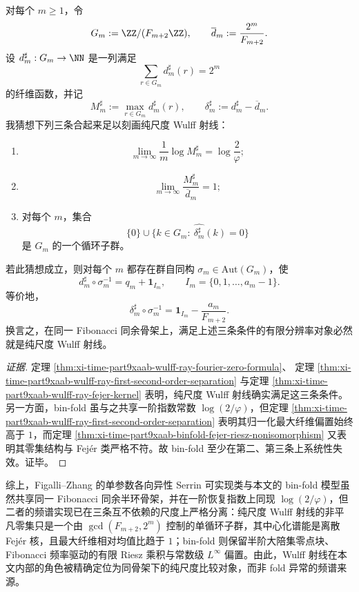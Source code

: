 \begin{conjecture}[Fej\'er 刚性]\label{conj:xi-time-part9xaab-fejer-rigidity}
对每个 \(m\ge 1\)，令
\[
G_m:=\ZZ/(F_{m+2}\ZZ),
\qquad
\overline d_m:=\frac{2^m}{F_{m+2}}.
\]
设 \(d_m^\sharp:G_m\to \NN\) 是一列满足
\[
\sum_{r\in G_m}d_m^\sharp(r)=2^m
\]
的纤维函数，并记
\[
M_m^\sharp:=\max_{r\in G_m}d_m^\sharp(r),
\qquad
\delta_m^\sharp:=d_m^\sharp-\overline d_m.
\]
我猜想下列三条合起来足以刻画纯尺度 Wulff 射线：
\begin{enumerate}
  \item
  \[
  \lim_{m\to\infty}\frac{1}{m}\log M_m^\sharp
  =
  \log\frac{2}{\varphi};
  \]
  \item
  \[
  \lim_{m\to\infty}\frac{M_m^\sharp}{\overline d_m}=1;
  \]
  \item 对每个 \(m\)，集合
  \[
  \{0\}\cup
  \bigl\{k\in G_m:\ \widehat{\delta_m^\sharp}(k)=0\bigr\}
  \]
  是 \(G_m\) 的一个循环子群。
\end{enumerate}
若此猜想成立，则对每个 \(m\) 都存在群自同构 \(\sigma_m\in \mathrm{Aut}(G_m)\)，使
\[
d_m^\sharp\circ \sigma_m^{-1}
=
q_m+\mathbf 1_{I_m},
\qquad
I_m=\{0,1,\dots,a_m-1\}.
\]
等价地，
\[
\delta_m^\sharp\circ \sigma_m^{-1}
=
\mathbf 1_{I_m}-\frac{a_m}{F_{m+2}}.
\]
换言之，在同一 Fibonacci 同余骨架上，满足上述三条条件的有限分辨率对象必然就是纯尺度 Wulff 射线。
\end{conjecture}
\begin{proof}[证据]
定理 \ref{thm:xi-time-part9xaab-wulff-ray-fourier-zero-formula}、
定理 \ref{thm:xi-time-part9xaab-wulff-ray-first-second-order-separation}
与定理 \ref{thm:xi-time-part9xaab-wulff-ray-fejer-kernel}
表明，纯尺度 Wulff 射线确实满足这三条条件。另一方面，bin-fold 虽与之共享一阶指数常数 \(\log(2/\varphi)\)，但定理 \ref{thm:xi-time-part9xaab-wulff-ray-first-second-order-separation} 表明其归一化最大纤维偏置始终高于 \(1\)，而定理 \ref{thm:xi-time-part9xaab-binfold-fejer-riesz-nonisomorphism} 又表明其零集结构与 Fej\'er 类严格不符。故 bin-fold 至少在第二、第三条上系统性失效。证毕。
\end{proof}

\noindent
综上，Figalli--Zhang 的单参数各向异性 Serrin 可实现类与本文的 bin-fold 模型虽然共享同一 Fibonacci 同余半环骨架，并在一阶恢复指数上同现 \(\log(2/\varphi)\)，但二者的频谱实现已在三条互不依赖的尺度上严格分离：纯尺度 Wulff 射线的非平凡零集只是一个由 \(\gcd(F_{m+2},2^m)\) 控制的单循环子群，其中心化谱能是离散 Fej\'er 核，且最大纤维相对均值比趋于 \(1\)；bin-fold 则保留半阶大陪集零点块、Fibonacci 频率驱动的有限 Riesz 乘积与常数级 \(L^\infty\) 偏置。由此，Wulff 射线在本文内部的角色被精确定位为同骨架下的纯尺度比较对象，而非 fold 异常的频谱来源。

\endinput
